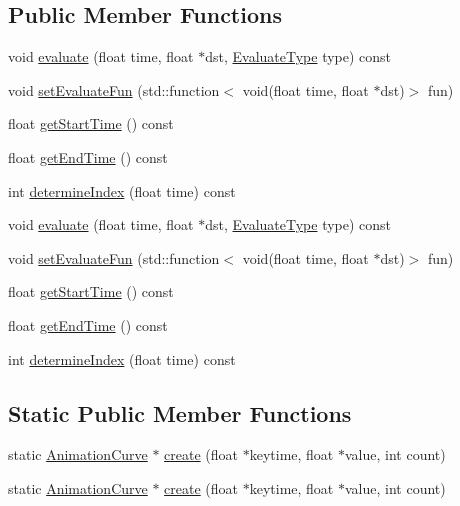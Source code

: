 \subsection*{Public Member Functions}
\begin{DoxyCompactItemize}
\item 
void \hyperlink{classAnimationCurve_ae66924d40f34253cc7fec8467c5258f4}{evaluate} (float time, float $\ast$dst, \hyperlink{group____3d_ga3c41e728b3058f4688800b2d4d1f5c95}{Evaluate\+Type} type) const
\item 
void \hyperlink{classAnimationCurve_a9b727759116fa4f25f2673bc93c90b37}{set\+Evaluate\+Fun} (std\+::function$<$ void(float time, float $\ast$dst)$>$ fun)
\item 
float \hyperlink{classAnimationCurve_ae06c8b473c612580a4a19aff7ab6324c}{get\+Start\+Time} () const
\item 
float \hyperlink{classAnimationCurve_a1d5ac1225ffe25eab4767d86a612dd0e}{get\+End\+Time} () const
\item 
int \hyperlink{classAnimationCurve_ac8ea5fa04e806eb0abf318111ac6c62f}{determine\+Index} (float time) const
\item 
void \hyperlink{classAnimationCurve_ab0a47534db7b8364490dc8dee8717c54}{evaluate} (float time, float $\ast$dst, \hyperlink{group____3d_ga3c41e728b3058f4688800b2d4d1f5c95}{Evaluate\+Type} type) const
\item 
void \hyperlink{classAnimationCurve_a9b727759116fa4f25f2673bc93c90b37}{set\+Evaluate\+Fun} (std\+::function$<$ void(float time, float $\ast$dst)$>$ fun)
\item 
float \hyperlink{classAnimationCurve_ae06c8b473c612580a4a19aff7ab6324c}{get\+Start\+Time} () const
\item 
float \hyperlink{classAnimationCurve_a1d5ac1225ffe25eab4767d86a612dd0e}{get\+End\+Time} () const
\item 
int \hyperlink{classAnimationCurve_ac8ea5fa04e806eb0abf318111ac6c62f}{determine\+Index} (float time) const
\end{DoxyCompactItemize}
\subsection*{Static Public Member Functions}
\begin{DoxyCompactItemize}
\item 
static \hyperlink{classAnimationCurve}{Animation\+Curve} $\ast$ \hyperlink{classAnimationCurve_a685f50c57ffcc554eeeece259442c16e}{create} (float $\ast$keytime, float $\ast$value, int count)
\item 
static \hyperlink{classAnimationCurve}{Animation\+Curve} $\ast$ \hyperlink{classAnimationCurve_a1911ef899220e06e7e3b92078fe4bd89}{create} (float $\ast$keytime, float $\ast$value, int count)
\end{DoxyCompactItemize}
